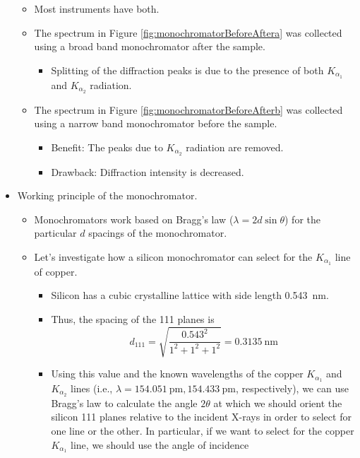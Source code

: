 \documentclass[../notes.tex]{subfiles}
\begin{document}
\begin{itemize}
\begin{itemize}
        \item Most instruments have both.
        \item The spectrum in Figure \ref{fig:monochromatorBeforeAftera} was collected using a broad band monochromator after the sample.
        \begin{itemize}
            \item Splitting of the diffraction peaks is due to the presence of both $K_{\alpha_1}$ and $K_{\alpha_2}$ radiation.
        \end{itemize}
        \item The spectrum in Figure \ref{fig:monochromatorBeforeAfterb} was collected using a narrow band monochromator before the sample.
        \begin{itemize}
            \item Benefit: The peaks due to $K_{\alpha_2}$ radiation are removed.
            \item Drawback: Diffraction intensity is decreased.
        \end{itemize}
    \end{itemize}
    \item Working principle of the monochromator.
    \begin{itemize}
        \item Monochromators work based on Bragg's law ($\lambda=2d\sin\theta$) for the particular $d$ spacings of the monochromator.
        \item Let's investigate how a silicon monochromator can select for the $K_{\alpha_1}$ line of copper.
        \begin{itemize}
            \item Silicon has a cubic crystalline lattice with side length \SI{0.543}{\nano\meter}.
            \item Thus, the spacing of the 111 planes is
            \begin{equation*}
                d_{111} = \sqrt{\frac{0.543^2}{1^2+1^2+1^2}} = \SI{0.3135}{\nano\meter}
            \end{equation*}
            \item Using this value and the known wavelengths of the copper $K_{\alpha_1}$ and $K_{\alpha_2}$ lines (i.e., $\lambda=\SI{154.051}{\pico\meter},\SI{154.433}{\pico\meter}$, respectively), we can use Bragg's law to calculate the angle $2\theta$ at which we should orient the silicon 111 planes relative to the incident X-rays in order to select for one line or the other. In particular, if we want to select for the copper $K_{\alpha_1}$ line, we should use the angle of incidence

\end{itemize}
\end{itemize}
\end{itemize}
\end{document}

